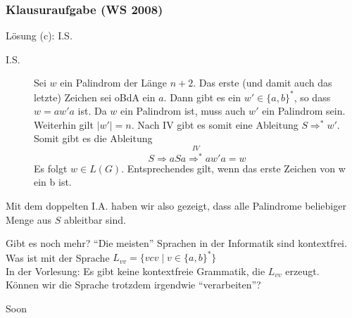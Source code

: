 \begin{frame}
	\frametitle{Klausuraufgabe (WS 2008)}
	\begin{block}{Lösung (c): I.S.}
		\begin{description}
			\item[I.S.] Sei $w$ ein Palindrom der Länge $n + 2$. Das erste (und damit auch das letzte) Zeichen sei oBdA ein $a$. Dann gibt es ein $w' \in \{a, b\}^\ast$, so dass $w = aw'a$ ist. Da $w$ ein Palindrom ist, muss auch $w'$ ein Palindrom sein. Weiterhin gilt $|w'| = n$. \pause Nach IV gibt es somit eine Ableitung $S \Rightarrow^\ast w'$. Somit gibt es die Ableitung $$S \Rightarrow aSa \overset{IV}{\Rightarrow^\ast} aw'a = w$$ Es folgt $w \in L(G)$. \pause Entsprechendes gilt, wenn das erste Zeichen von w ein b ist. \\ 
		\end{description}
		Mit dem doppelten I.A. haben wir also gezeigt, dass alle Palindrome beliebiger Menge aus $S$ ableitbar sind.
	\end{block}

\end{frame}

\begin{frame}{Gibt es noch mehr?}
	\enquote{Die meisten} Sprachen in der Informatik sind kontextfrei.\\[1em]
	Was ist mit der Sprache $L_{vv} = \{vcv \mid v \in \{a, b\}^*\}$\\
	\pause
	In der Vorlesung: Es gibt keine kontextfreie Grammatik, die $L_{vv}$ erzeugt.\\
	\pause
	Können wir die Sprache trotzdem irgendwie \enquote{verarbeiten}?
	
	\begin{block}{}
		\Large
		\centering
		Soon\\[1em]
	\end{block}
\end{frame}

